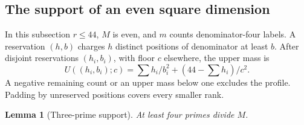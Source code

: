 \documentclass[11pt]{amsart}
\numberwithin{equation}{section}
\newtheorem{lemma}[theorem]{Lemma}
\theoremstyle{definition}
\theoremstyle{plain}
\begin{document}
\subsection{The support of an even square dimension}
In this subsection $r\le44$, $M$ is even, and $m$ counts denominator-four
labels. A reservation $(h,b)$ charges $h$ distinct positions of denominator
at least $b$. After disjoint reservations $(h_i,b_i)$, with floor $c$
elsewhere, the upper mass is
\[
 U((h_i,b_i);c)=\sum h_i/b_i^2+(44-\sum h_i)/c^2.
\]
A negative remaining count or an upper mass below one excludes the
profile. Padding by unreserved positions covers every smaller rank.

\begin{lemma}[Three-prime support]\label{result.Three-prime-rank}
At least four primes divide $M$.
\end{lemma}
\end{document}
